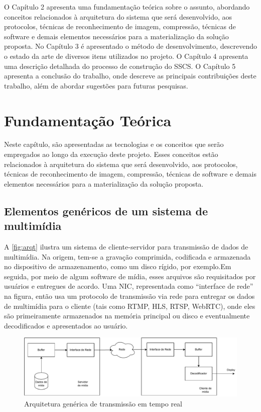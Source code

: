\documentclass[12pt, %
openright, 
oneside, %
a4paper,    %
brazil]{facom-ufu-abntex2}
\begin{document}
O Capítulo 2 apresenta uma fundamentação teórica sobre o assunto, abordando
conceitos relacionados à arquitetura do sistema que será desenvolvido, aos
protocolos, técnicas de reconhecimento de imagem, compressão, técnicas de
software e demais elementos necessários para a materialização da solução
proposta. No Capítulo 3 é apresentado o método de desenvolvimento, descrevendo
o estado da arte de diversos itens utilizados no projeto. O Capítulo 4
apresenta uma descrição detalhada do processo de construção do SSCS. O Capítulo
5 apresenta a conclusão do trabalho, onde descreve as principais contribuições
deste trabalho, além de abordar sugestões para futuras pesquisas.

\chapter{Fundamentação Teórica}

Neste capítulo, são apresentadas as tecnologias e os conceitos que serão
empregados ao longo da execução deste projeto. Esses conceitos estão
relacionados à arquitetura do sistema que será desenvolvido, aos protocolos,
técnicas de reconhecimento de imagem, compressão, técnicas de software e demais
elementos necessários para a materialização da solução proposta.

\section{Elementos genéricos de um sistema de multimídia}

A \autoref{fig:arqt} ilustra um sistema de cliente-servidor para transmissão de
dados de multimídia. Na origem, tem-se a gravação comprimida, codificada e
armazenada no dispositivo de armazenamento, como um disco rígido, por
exemplo.Em seguida, por meio de algum software de mídia, esses arquivos são
requisitados por usuários e entregues de acordo. Uma NIC, representada como
``interface de rede'' na figura, então usa um protocolo de transmissão via rede
para entregar os dados de multimídia para o cliente (tais como RTMP, HLS, RTSP,
WebRTC), onde eles são primeiramente armazenados na memória principal ou disco
e eventualmente decodificados e apresentados ao usuário.

\begin{figure}[!ht]
	\centering
	\includegraphics[width=1\linewidth]{media_fundamentals.pdf}
	\caption[Representação de um arquitetura de tempo real
		genérica]{Arquitetura genérica de transmissão em tempo real}
	\label{fig:arqt}
\end{figure}
\end{document}
